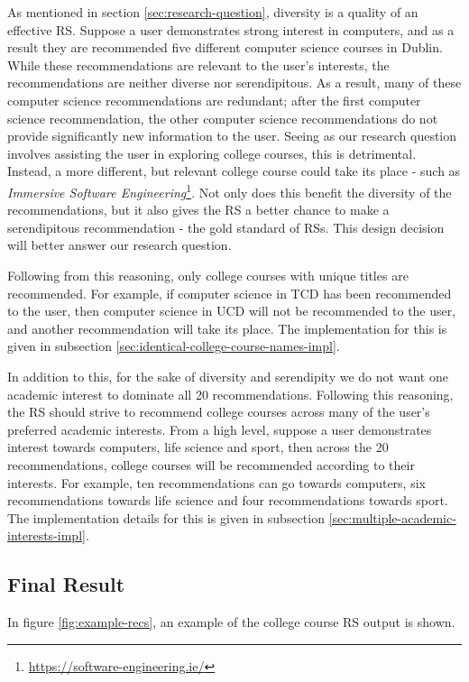 As mentioned in section \ref{sec:research-question}, diversity is a quality of an effective RS.
Suppose a user demonstrates strong interest in computers, and as a result 
they are recommended five different computer science courses in Dublin.
While these recommendations are relevant to the user's interests, 
the recommendations are neither diverse nor serendipitous.
As a result, many of these computer science recommendations are redundant;
after the first computer science recommendation, the other computer science recommendations do not provide significantly new information to the user.
Seeing as our research question involves assisting the user in exploring college courses, this is detrimental.
Instead, a more different, but relevant college course could take its place - such as \emph{Immersive Software Engineering}\footnote{\url{https://software-engineering.ie/}}.
Not only does this benefit the diversity of the recommendations, but it also 
gives the RS a better chance to make a serendipitous recommendation - the gold standard of RSs.
This design decision will better answer our research question.

Following from this reasoning, only college courses with unique titles are recommended.
For example, if computer science in TCD has been recommended to the user,
then computer science in UCD will not be recommended to the user, 
and another recommendation will take its place.
The implementation for this is given in subsection \ref{sec:identical-college-course-names-impl}.

In addition to this, for the sake of diversity and serendipity we do not want one academic interest 
to dominate all 20 recommendations.
Following this reasoning, the RS should strive to recommend college courses across
many of the user's preferred academic interests.
From a high level, suppose a user demonstrates interest towards computers, life science and 
sport, then across the 20 recommendations, college courses will be recommended 
according to their interests.
For example, ten recommendations can go towards computers, six recommendations towards life science
and four recommendations towards sport.
The implementation details for this is given in subsection \ref{sec:multiple-academic-interests-impl}.

\subsection{Final Result}

In figure \ref{fig:example-recs}, an example of the college course RS output is shown.


